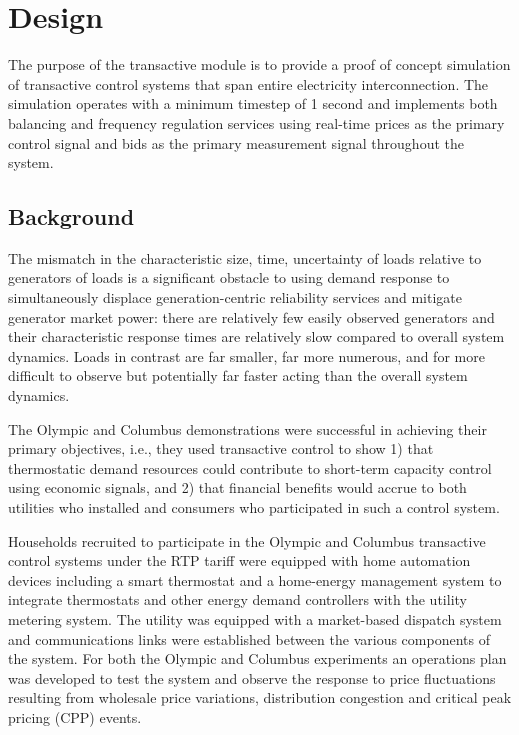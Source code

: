 \chapter{Design}

The purpose of the transactive module is to provide a proof of concept simulation of transactive control systems that span entire electricity interconnection. The simulation operates with a minimum timestep of 1 second and implements both balancing and frequency regulation services using real-time prices as the primary control signal and bids as the primary measurement signal throughout the system.

\section{Background}

The mismatch in the characteristic size, time, uncertainty of loads relative to generators of loads is a significant obstacle to using demand response to simultaneously displace generation-centric reliability services and mitigate generator market power: there are relatively few easily observed generators and their characteristic response times are relatively slow compared to overall system dynamics. Loads in contrast are far smaller, far more numerous, and for more difficult to observe but potentially far faster acting than the overall system dynamics.  

The Olympic \cite{hammerstrom2007} and Columbus \cite{widergren2014} demonstrations were successful in achieving their primary objectives, i.e., they used transactive control to show 1) that thermostatic demand resources could contribute to short-term capacity control using economic signals, and 2) that financial benefits would accrue to both utilities who installed and consumers who participated in such a control system.

Households recruited to participate in the Olympic and Columbus transactive control systems under the RTP tariff were equipped with home automation devices including a smart thermostat and a home-energy management system to integrate thermostats and other energy demand controllers with the utility metering system. The utility was equipped with a market-based dispatch system and communications links were established between the various components of the system.  For both the Olympic and Columbus experiments an operations plan was developed to test the system and observe the response to price fluctuations resulting from wholesale price variations, distribution congestion and critical peak pricing (CPP) events.

